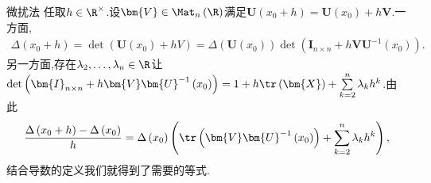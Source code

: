 \begin{sketch}{微扰法}{}
	任取$h\in\R^{\times}$.设$\bm{V}\in\Mat_{n}\left(\R\right)$满足$\bm{U}\left(x_{0}+h\right)=\bm{U}\left(x_{0}\right)+h\bm{V}$.一方面,
	\begin{align*}
		\Delta\left(x_{0}+h\right)=\det\left(\bm{U}\left(x_{0}\right)+hV\right)=\Delta\left(\bm{U}\left(x_{0}\right)\right)\det\left(\bm{I}_{n\times n}+h\bm{V}\bm{U}^{-1}\left(x_{0}\right)\right).
	\end{align*}
	另一方面,存在$\lambda_{2},\ldots,\lambda_{n}\in\R$让$\det\left(\bm{I}_{n\times n}+h\bm{V}\bm{U}^{-1}\left(x_{0}\right)\right)=1+h\tr\left(\bm{X}\right)+\sum\limits_{k=2}^{n}\lambda_{k}h^{k}$.由此
	\begin{align*}
		\frac{\Delta\left(x_{0}+h\right)-\Delta\left(x_{0}\right)}{h}=\Delta\left(x_{0}\right)\left(\tr\left(\bm{V}\bm{U}^{-1}\left(x_{0}\right)\right)+\sum\limits_{k=2}^{n}\lambda_{k}h^{k}\right),
	\end{align*}
	结合导数的定义我们就得到了需要的等式.
\end{sketch}































